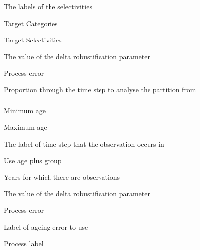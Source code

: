  {The labels of the selectivities}

 {Target Categories}

 {Target Selectivities}

 {The value of the delta robustification parameter}

 {Process error}

 {Proportion through the time step to analyse the partition from}

\subsubsection[Proportions Migrating]{}

 {Minimum age}

 {Maximum age}

 {The label of time-step that the observation occurs in}

 {Use age plus group}

 {Years for which there are observations}

 {The value of the delta robustification parameter}

 {Process error}

 {Label of ageing error to use}

 {Process label}

\subsubsection[Tag Recapture By Age]{}

